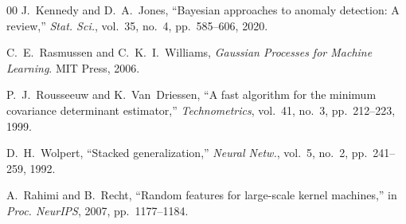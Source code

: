 \documentclass[conference,10pt]{IEEEtran}
\begin{document}
\begin{thebibliography}{00}
J.~Kennedy and D.~A.~Jones, ``Bayesian approaches to anomaly detection: A review,'' \textit{Stat. Sci.}, vol.~35, no.~4, pp.~585--606, 2020.

C.~E.~Rasmussen and C.~K.~I.~Williams, \textit{Gaussian Processes for Machine Learning}. MIT Press, 2006.

P.~J.~Rousseeuw and K.~Van~Driessen, ``A fast algorithm for the minimum covariance determinant estimator,'' \textit{Technometrics}, vol.~41, no.~3, pp.~212--223, 1999.

D.~H.~Wolpert, ``Stacked generalization,'' \textit{Neural Netw.}, vol.~5, no.~2, pp.~241--259, 1992.

A.~Rahimi and B.~Recht, ``Random features for large-scale kernel machines,'' in \textit{Proc. NeurIPS}, 2007, pp.~1177--1184.

\end{thebibliography}
\end{document}
